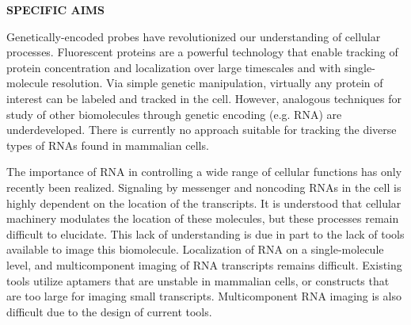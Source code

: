 
\noindent \begin{center}
{\bf SPECIFIC AIMS}
\end{center}

Genetically-encoded probes have revolutionized our understanding of cellular processes. Fluorescent proteins are a powerful technology that enable tracking of protein concentration and localization over large timescales and with single-molecule resolution. Via simple genetic manipulation, virtually any protein of interest can be labeled and tracked in the cell. However, analogous techniques for study of other biomolecules through genetic encoding (e.g. RNA)  are underdeveloped. There is currently no approach suitable for tracking the diverse types of RNAs found in mammalian cells. %

The importance of RNA in controlling a wide range of cellular functions has only recently been realized.\cite{CechNoncodingRNARevolution2014} Signaling by messenger and noncoding RNAs in the cell is highly dependent on the location of the transcripts. It is understood that cellular machinery modulates the location of these molecules, but these processes remain difficult to elucidate.\cite{Muller-McNicollHowcellsget2013a}
This lack of understanding is due in part to the lack of tools available to image this biomolecule. Localization of RNA on a single-molecule level, and multicomponent imaging of RNA transcripts remains difficult. Existing tools utilize aptamers that are unstable in mammalian cells\cite{EtzelSyntheticRiboswitchesPlug2017}, or constructs that are too large for imaging small transcripts. Multicomponent RNA imaging is also difficult due to the design of current tools.


